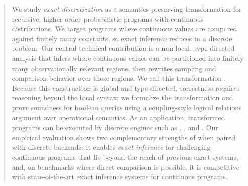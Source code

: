 \begin{abstract}
We study \emph{exact discretization} as a semantics-preserving transformation for recursive, higher-order probabilistic programs with continuous distributions. We target programs where continuous values are compared against finitely many constants, so exact inference reduces to a discrete problem. Our central technical contribution is a non-local, type-directed analysis that infers where continuous values can be partitioned into finitely many observationally relevant regions, then rewrites sampling and comparison behavior over those regions. We call this transformation \Slice{}. Because this construction is global and type-directed, correctness requires reasoning beyond the local syntax: we formalize the transformation and prove soundness for boolean queries using a coupling-style logical relations argument over operational semantics. As an application, transformed programs can be executed by discrete engines such as \Dice{}, \Roulette{}, and \Storm{}. Our empirical evaluation shows two complementary strengths of \Slice{} when paired with discrete backends: it enables \emph{exact inference} for challenging continuous programs that lie beyond the reach of previous exact systems, and, on benchmarks where direct comparison is possible, it is competitive with state-of-the-art exact inference systems for continuous programs.
\end{abstract}
